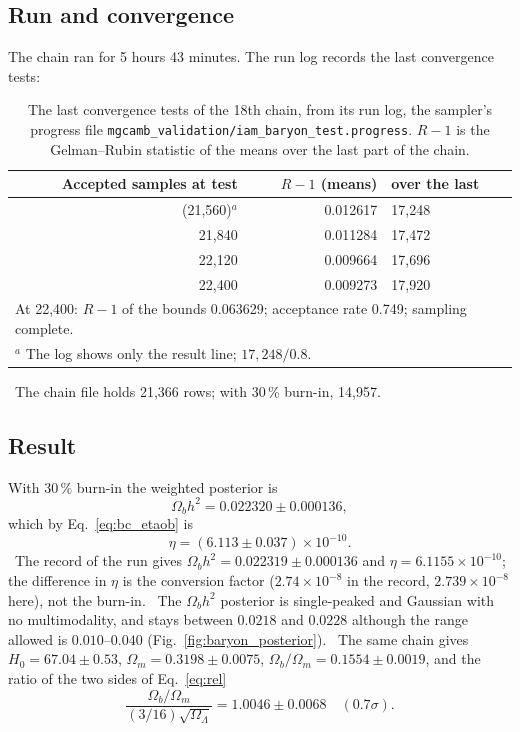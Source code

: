 \subsection{Run and convergence}
The chain ran for 5 hours 43 minutes. The run log records the last convergence tests:
\begin{table}[htbp]\centering\small
\caption[Convergence of the 18th chain]{The last convergence tests of the 18th chain, from its run log, the sampler's progress file \texttt{mgcamb\_validation/\allowbreak{}iam\_baryon\_test.progress}. $R-1$ is the Gelman--Rubin statistic of the means over the last part of the chain.}\label{tab:bc_conv}
\begin{tabular}{rrl}\toprule
Accepted samples at test & $R-1$ (means) & over the last\\\midrule
(21{,}560)$^{a}$ & 0.012617 & 17{,}248 \\
21{,}840 & 0.011284 & 17{,}472 \\
22{,}120 & 0.009664 & 17{,}696 \\
22{,}400 & 0.009273 & 17{,}920 \\\midrule
\multicolumn{3}{l}{At 22,400: $R-1$ of the bounds 0.063629; acceptance rate 0.749; sampling complete.}\\
\multicolumn{3}{l}{$^{a}$ The log shows only the result line; $17{,}248/0.8$.}\\\bottomrule
\end{tabular}
\end{table}
\measured\ The chain file holds 21,366 rows; with 30\,\% burn-in, 14,957. \observed\

\subsection{Result}\label{sec:bc_result}
With 30\,\% burn-in the weighted posterior is
\begin{equation}\Omega_bh^2=0.022320\pm0.000136,\label{eq:bc_ob}\end{equation}
which by Eq.~\eqref{eq:bc_etaob} is
\begin{equation}\eta=(6.113\pm0.037)\times10^{-10}.\label{eq:bc_etares}\end{equation}
\measured\ The record of the run gives $\Omega_bh^2=0.022319\pm0.000136$ and $\eta=6.1155\times10^{-10}$; the difference in $\eta$ is
the conversion factor ($2.74\times10^{-8}$ in the record, $2.739\times10^{-8}$ here), not the burn-in. \calc\ The $\Omega_bh^2$
posterior is single-peaked and Gaussian with no multimodality, and stays between $0.0218$ and $0.0228$ although the range allowed is
$0.010$--$0.040$ (Fig.~\ref{fig:baryon_posterior}). \measured\ The same chain gives $H_0=67.04\pm0.53$, $\Omega_m=0.3198\pm0.0075$,
$\Omega_b/\Omega_m=0.1554\pm0.0019$, and the ratio of the two sides of Eq.~\eqref{eq:rel}
\begin{equation}\frac{\Omega_b/\Omega_m}{(3/16)\sqrt{\Omega_\Lambda}}=1.0046\pm0.0068\quad(0.7\sigma).\label{eq:bc_ratio}\end{equation}
\measured

